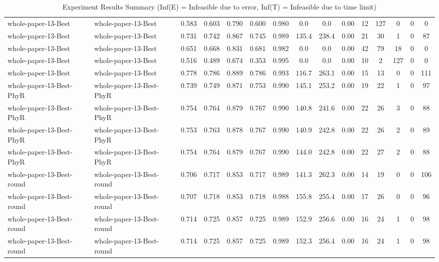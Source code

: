 \begin{table*}[p]
{\begin{tabular}{llccccccccccccc}
      whole-paper-13-Best & whole-paper-13-Best & 0.583 & 0.603 & 0.790 & 0.600 & 0.980 & 0.0 & 0.0 & 0.00 & 12 & 127 & 0 & 0 & 0 \\
      whole-paper-13-Best & whole-paper-13-Best & 0.731 & 0.742 & 0.867 & 0.745 & 0.989 & 135.4 & 238.4 & 0.00 & 21 & 30 & 1 & 0 & 87 \\
      whole-paper-13-Best & whole-paper-13-Best & 0.651 & 0.668 & 0.831 & 0.681 & 0.982 & 0.0 & 0.0 & 0.00 & 42 & 79 & 18 & 0 & 0 \\
      whole-paper-13-Best & whole-paper-13-Best & 0.516 & 0.489 & 0.674 & 0.353 & 0.995 & 0.0 & 0.0 & 0.00 & 10 & 2 & 127 & 0 & 0 \\
      whole-paper-13-Best & whole-paper-13-Best & 0.778 & 0.786 & 0.889 & 0.786 & 0.993 & 116.7 & 263.1 & 0.00 & 15 & 13 & 0 & 0 & 111 \\
      whole-paper-13-Best-PhyR & whole-paper-13-Best-PhyR & 0.739 & 0.749 & 0.871 & 0.753 & 0.990 & 145.1 & 253.2 & 0.00 & 19 & 22 & 1 & 0 & 97 \\
      whole-paper-13-Best-PhyR & whole-paper-13-Best-PhyR & 0.754 & 0.764 & 0.879 & 0.767 & 0.990 & 140.8 & 241.6 & 0.00 & 22 & 26 & 3 & 0 & 88 \\
      whole-paper-13-Best-PhyR & whole-paper-13-Best-PhyR & 0.753 & 0.763 & 0.878 & 0.767 & 0.990 & 140.9 & 242.8 & 0.00 & 22 & 26 & 2 & 0 & 89 \\
      whole-paper-13-Best-PhyR & whole-paper-13-Best-PhyR & 0.754 & 0.764 & 0.879 & 0.767 & 0.990 & 144.0 & 242.8 & 0.00 & 22 & 27 & 2 & 0 & 88 \\
      whole-paper-13-Best-round & whole-paper-13-Best-round & 0.706 & 0.717 & 0.853 & 0.717 & 0.989 & 141.3 & 262.3 & 0.00 & 14 & 19 & 0 & 0 & 106 \\
      whole-paper-13-Best-round & whole-paper-13-Best-round & 0.707 & 0.718 & 0.853 & 0.718 & 0.988 & 155.8 & 255.4 & 0.00 & 17 & 26 & 0 & 0 & 96 \\
      whole-paper-13-Best-round & whole-paper-13-Best-round & 0.714 & 0.725 & 0.857 & 0.725 & 0.989 & 152.9 & 256.6 & 0.00 & 16 & 24 & 1 & 0 & 98 \\
      whole-paper-13-Best-round & whole-paper-13-Best-round & 0.714 & 0.725 & 0.857 & 0.725 & 0.989 & 152.3 & 256.4 & 0.00 & 16 & 24 & 1 & 0 & 98 \\
      \bottomrule
    \end{tabular}%
  }
  \caption{Experiment Results Summary (Inf(E) = Infeasible due to error, Inf(T) = Infeasible due to time limit)}
  \label{tab:experiment-results}
\end{table*}
